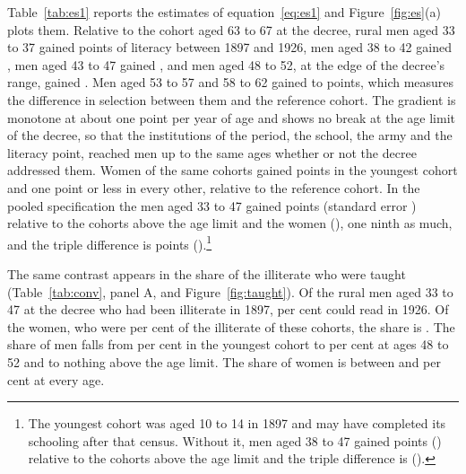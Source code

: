 Table~\ref{tab:es1} reports the estimates of equation~\eqref{eq:es1} and Figure~\ref{fig:es}(a) plots them. Relative to the cohort aged 63 to 67 at the decree, rural men aged 33 to 37 gained  points of literacy between 1897 and 1926, men aged 38 to 42 gained , men aged 43 to 47 gained , and men aged 48 to 52, at the edge of the decree's range, gained . Men aged 53 to 57 and 58 to 62 gained  to  points, which measures the difference in selection between them and the reference cohort. The gradient is monotone at about one point per year of age and shows no break at the age limit of the decree, so that the institutions of the period, the school, the army and the literacy point, reached men up to the same ages whether or not the decree addressed them. Women of the same cohorts gained  points in the youngest cohort and one point or less in every other, relative to the reference cohort. In the pooled specification the men aged 33 to 47 gained  points (standard error ) relative to the cohorts above the age limit and the women  (), one ninth as much, and the triple difference is  points ().\footnote{The youngest cohort was aged 10 to 14 in 1897 and may have completed its schooling after that census. Without it, men aged 38 to 47 gained  points () relative to the cohorts above the age limit and the triple difference is  ().}

The same contrast appears in the share of the illiterate who were taught (Table~\ref{tab:conv}, panel A, and Figure~\ref{fig:taught}). Of the rural men aged 33 to 47 at the decree who had been illiterate in 1897,  per cent could read in 1926. Of the women, who were  per cent of the illiterate of these cohorts, the share is . The share of men falls from  per cent in the youngest cohort to  per cent at ages 48 to 52 and to nothing above the age limit. The share of women is between  and  per cent at every age.


